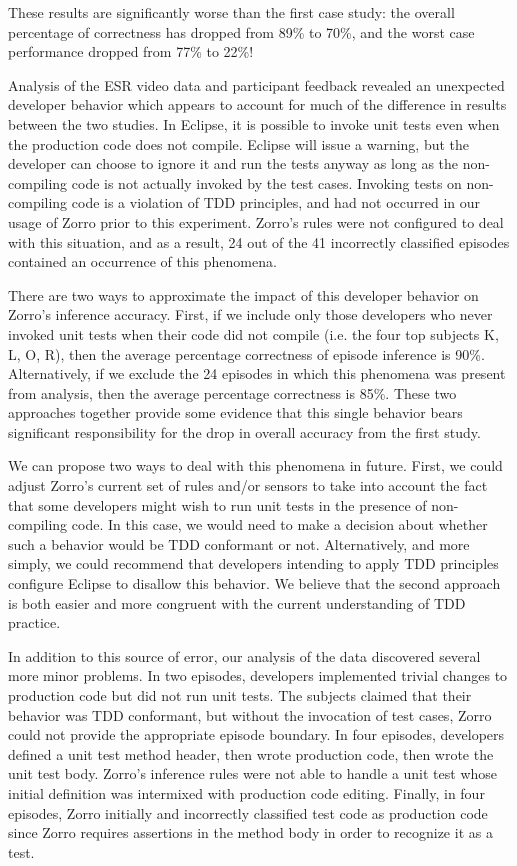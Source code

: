\documentclass[smallextended]{svjour3}     %
\begin{document}
These results are significantly worse than the first case study: the
overall percentage of correctness has dropped from 89\% to 70\%, and the
worst case performance dropped from 77\% to 22\%!

Analysis of the ESR video data and participant feedback revealed an
unexpected developer behavior which appears to account for much of the
difference in results between the two studies.  In Eclipse, it is possible
to invoke unit tests even when the production code does not
compile. Eclipse will issue a warning, but the developer can choose to
ignore it and run the tests anyway as long as the non-compiling code is not
actually invoked by the test cases.  Invoking tests on non-compiling
code is a violation of TDD principles, and had not occurred in our usage
of Zorro prior to this experiment. Zorro's rules were not configured to
deal with this situation, and as a result, 24 out of the 41 incorrectly
classified episodes contained an occurrence of this phenomena.

There are two ways to approximate the impact of this developer behavior on
Zorro's inference accuracy.  First, if we include only those developers who
never invoked unit tests when their code did not compile (i.e. the four top
subjects K, L, O, R), then the average percentage correctness of episode
inference is 90\%. Alternatively, if we exclude the 24 episodes in which
this phenomena was present from analysis, then the average percentage
correctness is 85\%.  These two approaches together provide some evidence that this
single behavior bears significant responsibility for the drop in overall accuracy
from the first study.

We can propose two ways to deal with this phenomena in future.  First, we
could adjust Zorro's current set of rules and/or sensors to take into
account the fact that some developers might wish to run unit tests in the
presence of non-compiling code. In this case, we would need to make a
decision about whether such a behavior would be TDD conformant or not.
Alternatively, and more simply, we could recommend that developers
intending to apply TDD principles configure Eclipse to disallow this
behavior.  We believe that the second approach is both easier and more
congruent with the current understanding of TDD practice.

In addition to this source of error, our analysis of the data discovered
several more minor problems. In two episodes, developers implemented trivial
changes to production code but did not run unit tests. The subjects claimed
that their behavior was TDD conformant, but without the invocation of test
cases, Zorro could not provide the appropriate episode boundary.  In four
episodes, developers defined a unit test method header, then wrote
production code, then wrote the unit test body.  Zorro's inference rules
were not able to handle a unit test whose initial definition was intermixed
with production code editing. Finally, in four episodes, Zorro initially
and incorrectly classified test code as production code since Zorro
requires assertions in the method body in order to recognize it as a test. 
\end{document}
